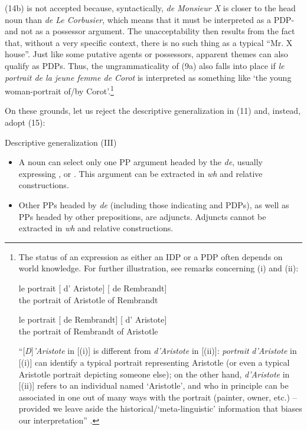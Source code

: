 \documentclass[output=paper]{langsci/langscibook}
\begin{document}
(14b) is not accepted because, syntactically, \textit{de Monsieur X} is closer to the head noun than \textit{de Le Corbusier}, which means that it must be interpreted as a PDP- and not as a possessor argument. The unacceptability then results from the fact that, without a very specific context, there is no such thing as a typical “Mr. X house”. Just like some putative agents or possessors, apparent themes can also qualify as PDPs. Thus, the ungrammaticality of (9a) also falls into place if \textit{le portrait de la jeune femme de Corot} is interpreted as something like ‘the young woman-portrait of/by Corot’.\footnote{The status of an expression as either an IDP or a PDP often depends on world knowledge. For further illustration, see  remarks concerning (i) and (ii):

\ea \gll le  portrait  [ d’  Aristote]  [ de  Rembrandt]\\
        the  portrait {} of  Aristotle {}  of  Rembrandt\\
    \z
    
\ea \gll le  portrait  [ de  Rembrandt]  [ d’  Aristote]\\
        the  portrait {} of  Rembrandt {} of  Aristotle\\
    \z
    
    \noindent“[\textit{D}]\textit{’Aristote} in [(i)] is different from \textit{d’Aristote} in [(ii)]: \textit{portrait} \textit{d’Aristot}\textit{e}\textbf{ }in [(i)] can identify a typical portrait representing Aristotle (or even a typical Aristotle portrait depicting someone else); on the other hand, \textit{d’Aristo}\textit{te} in [(ii)] refers to an individual named ‘Aristotle’, and who in principle can be associated in one out of many ways with the portrait (painter, owner, etc.) – provided we leave aside the historical/‘meta-linguistic’ information that biases our interpretation” \citep[748]{Kolliakou1999}.}

On these grounds, let us reject the descriptive generalization in (11) and, instead, adopt (15):

\begin{exe}
\ex%
    \label{ex:mensch:15}
Descriptive generalization (III)

\begin{itemize}
\item A noun can select only one PP argument headed by the  \textit{de}, usually expressing \AGENT, \THEME or \POSSESSOR. This argument can be extracted in \textit{wh} and relative constructions.
\item Other PPs headed by \textit{de} (including those indicating \SOURCE and \linebreak PDPs), as well as PPs headed by other prepositions, are adjuncts. Adjuncts cannot be extracted in \textit{wh} and relative constructions.
\end{itemize}
\end{exe}
\end{document}

